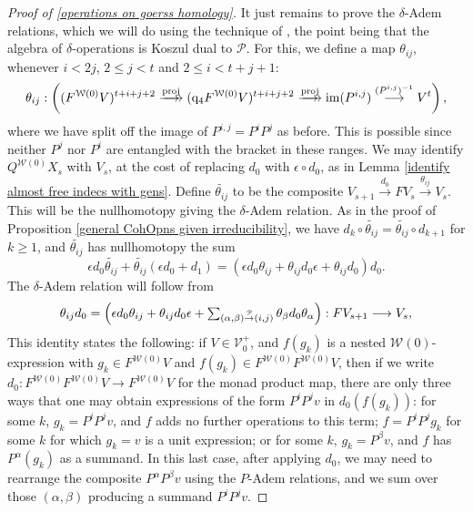 \documentclass[11pt]{amsart} \renewcommand{\baselinestretch}{1.4}
\theoremstyle{plain}
\theoremstyle{definition}
\DeclareMathOperator{\im}{im}
\renewcommand{\to}{\longrightarrow}
\newcommand{\calP}{\mathcal{P}}
\newcommand{\calV}{\mathcal{V}}
\newcommand{\calw}{\mathcal{W}}
\newcommand{\Palg}{{\calP}}
\newcommand{\vect}[2]{\calV^{#1}_{#2}}
\newcommand{\quadgrad}[1]{\mathrm{q}_{#1}}
\newcommand{\produces}[3]{#3:#1\sim #2}
\renewcommand{\produces}[3]{#1\rightarrow_{#3} #2}%
\renewcommand{\produces}[3]{#1\overset{\smash{#3}}{\rightarrow} #2}%
\begin{document}
\begin{Cohomology Operations for W and U}
\begin{proof}[Proof of \ref{operations on goerss homology}]
It just remains to prove the $\delta$-Adem relations, which we will do using the technique of \cite{PriddyKoszul.pdf}, the point being that the algebra of $\delta$-operations is Koszul dual to $\Palg$. For this, we define a map $\theta_{ij}$, whenever $i<2j$, $2\leq j<t$ and $2\leq i<t+j+1$:
\[\theta_{ij}:\left((F^{\calw(0)}V)^{t+i+j+2}\overset{\textup{proj}}{\makebox[.06ex][l]{$\to$}\to} (\quadgrad{4}F^{\calw(0)}V)^{t+i+j+2}\overset{\textup{proj}}{\makebox[.06ex][l]{$\to$}\to} \im (P^{i,j})\overset{(P^{i,j})^{-1}}{\to}V^{t}\right),\]
where we have split off the image of 
$P^{i,j}=P^iP^j$ %
as before. This is possible since neither $P^j$ nor $P^i$ are entangled with the bracket in these ranges. We may identify $Q^{\calw(0)}X_s$ with $V_s$, at the cost of replacing $d_0$ with $\epsilon\circ d_0$, as in Lemma \ref{identify almost free indecs with gens}.  Define $\widetilde{\theta_{ij}}$ to be the composite $V_{s+1}\overset{d_0}{\to}FV_s\overset{\theta_{ij}}{\to}V_s$. This will be the nullhomotopy giving the $\delta$-Adem relation. %
As in the proof of Proposition \ref{general CohOpns given irreducibility}, we have $d_k\circ\widetilde{\theta_{ij}}=\widetilde{\theta_{ij}}\circ d_{k+1}$ for $k\geq1$, and $\widetilde{\theta_{ij}}$ has nullhomotopy the sum
\[\epsilon d_0\widetilde{\theta_{ij}}+\widetilde{\theta_{ij}}(\epsilon d_0+d_1)=(\epsilon d_0\theta_{ij}+\theta_{ij}d_0\epsilon+\theta_{ij}d_0)d_0.\]
The $\delta$-Adem relation will follow from
\[\textstyle\theta_{ij}d_0=\Bigl(\epsilon d_0\theta_{ij}+\theta_{ij}d_0\epsilon+\sum_{\produces{(\alpha,\beta)}{(i,j)}{\Palg}}\theta_\beta d_0\theta_\alpha\Bigr):FV_{s+1}\to V_s,\]
This identity states the following: if $V\in\vect{+}{0}$, and $f(g_k)$ is a nested $\calw(0)$-expression with $g_k\in F^{\calw(0)}V$ and $f(g_k)\in F^{\calw(0)}F^{\calw(0)}V$, then if we write $d_0:F^{\calw(0)}F^{\calw(0)}V\to F^{\calw(0)}V$ for the monad product map, there are only three ways that one may obtain expressions of the form $P^iP^jv$ in $d_0(f(g_k))$: for some $k$, $g_k=P^iP^jv$, and $f $ adds no further operations to this term; $f=P^iP^jg_{k}$ for some $k$ for which $g_{k}=v$ is a unit expression; or for some $k$, $g_k=P^\beta v$, and  $f$ has $P^\alpha(g_k)$ as a summand. In this last case, after applying $d_0$, we may need to rearrange the composite $P^{\alpha}P^{\beta}v$ using the $P$-Adem relations, and we sum over those $(\alpha,\beta)$ producing a summand $P^iP^jv$.


\end{proof}
\end{Cohomology Operations for W and U}
\end{document}
